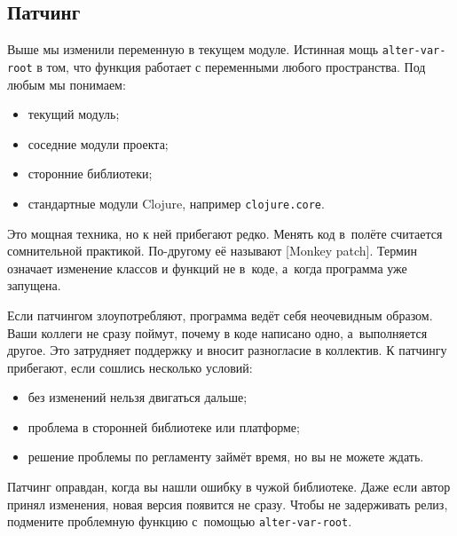 \subsection{Патчинг}


Выше мы изменили переменную в текущем модуле. Истинная мощь
\verb|alter-var-root| в том, что функция работает с переменными любого
пространства. Под любым мы понимаем:

\begin{itemize}

\item
  текущий модуль;

\item
  соседние модули проекта;

\item
  сторонние библиотеки;

\item
  стандартные модули Clojure, например \texttt{clo\-ju\-re.co\-re}.

\end{itemize}


Это мощная техника, но к ней прибегают редко. Менять код в~полёте считается
сомнительной практикой. По-другому её называют
[Monkey patch].
Термин означает изменение классов и функций не в~коде, а~когда программа уже запущена.

Если патчингом злоупотребляют, программа ведёт себя неочевидным образом. Ваши
коллеги не сразу поймут, почему в коде написано одно, а~выполняется другое. Это
затрудняет поддержку и вносит разногласие в коллектив. К патчингу прибегают,
если сошлись несколько условий:

\begin{itemize}

\item
  без изменений нельзя двигаться дальше;

\item
  проблема в сторонней библиотеке или платформе;

\item
  решение проблемы по регламенту займёт время, но вы не можете ждать.

\end{itemize}

Патчинг оправдан, когда вы нашли ошибку в чужой библиотеке. Даже если автор
принял изменения, новая версия появится не сразу. Чтобы не задерживать релиз,
подмените проблемную функцию с~помощью \verb|alter-var-root|.


